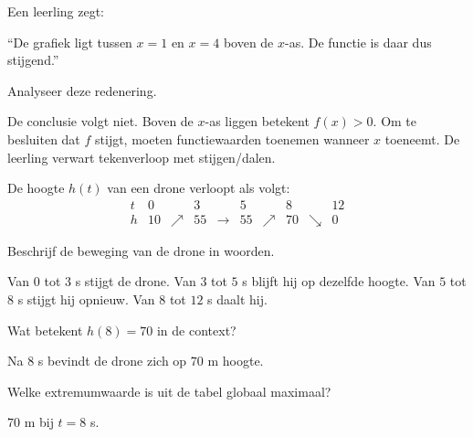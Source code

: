 \documentclass{ximera}
\begin{document}
\begin{oefening}[Foutenanalyse]{\oefU\ESS}

Een leerling zegt:

``De grafiek ligt tussen \(x=1\) en \(x=4\) boven de \(x\)-as.
De functie is daar dus stijgend.''

Analyseer deze redenering.

\begin{oplossing}
De conclusie volgt niet. Boven de \(x\)-as liggen betekent \(f(x)>0\).
Om te besluiten dat \(f\) stijgt, moeten functiewaarden toenemen wanneer
\(x\) toeneemt. De leerling verwart tekenverloop met stijgen/dalen.
\end{oplossing}
\end{oefening}

\begin{oefening}{\oefU\ESS}

De hoogte \(h(t)\) van een drone verloopt als volgt:
\[
\begin{array}{c|ccccccccc}
t&0&&3&&5&&8&&12\\ \hline
h&10&\nearrow&55&\longrightarrow&55&\nearrow&70&\searrow&0
\end{array}
\]

\begin{question}
Beschrijf de beweging van de drone in woorden.
\begin{oplossing}
Van \(0\) tot \(3\) s stijgt de drone. Van \(3\) tot \(5\) s blijft hij
op dezelfde hoogte. Van \(5\) tot \(8\) s stijgt hij opnieuw.
Van \(8\) tot \(12\) s daalt hij.
\end{oplossing}
\end{question}

\begin{question}
Wat betekent \(h(8)=70\) in de context?
\begin{oplossing}
Na \(8\) s bevindt de drone zich op \(70\) m hoogte.
\end{oplossing}
\end{question}

\begin{question}
Welke extremumwaarde is uit de tabel globaal maximaal?
\begin{oplossing}
\(70\) m bij \(t=8\) s.
\end{oplossing}
\end{question}
\end{oefening}
\end{document}
